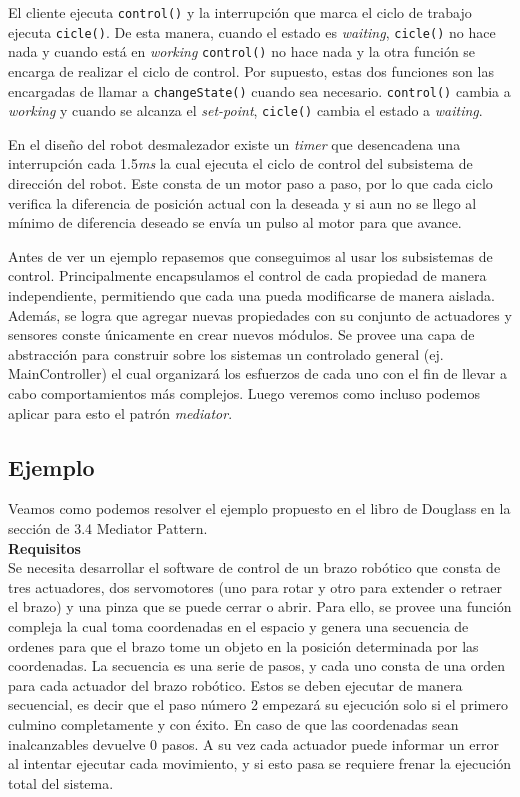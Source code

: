 El cliente ejecuta \verb|control()| y la interrupción que marca el ciclo de trabajo ejecuta \verb|cicle()|. De esta manera, cuando el estado es \textit{waiting}, \verb|cicle()| no hace nada y cuando está en \textit{working} \verb|control()| no hace nada y la otra función se encarga de realizar el ciclo de control.
Por supuesto, estas dos funciones son las encargadas de llamar a \verb|changeState()| cuando sea necesario. \verb|control()| cambia a \textit{working} y cuando se alcanza el \textit{set-point}, \verb|cicle()| cambia el estado a \textit{waiting}.

En el diseño del robot desmalezador\cite{paperPomponio} existe un \textit{timer} que desencadena una interrupción cada 1.5\textit{ms} la cual ejecuta el ciclo de control del subsistema de dirección del robot. Este consta de un motor paso a paso, por lo que cada ciclo verifica la diferencia de posición actual con la deseada y si aun no se llego al mínimo de diferencia deseado se envía un pulso al motor para que avance.

Antes de ver un ejemplo repasemos que conseguimos al usar los subsistemas de control. Principalmente encapsulamos el control de cada propiedad de manera independiente, permitiendo que cada una pueda modificarse de manera aislada. Además, se logra que agregar nuevas propiedades con su conjunto de actuadores y sensores conste únicamente en crear nuevos módulos. Se provee una capa de abstracción para construir sobre los sistemas un controlado general (ej. MainController) el cual organizará los esfuerzos de cada uno con el fin de llevar a cabo comportamientos más complejos. Luego veremos como incluso podemos aplicar para esto el patrón \textit{mediator}.

\subsection{Ejemplo}

Veamos como podemos resolver el ejemplo propuesto en el libro de Douglass\cite{douglass} en la sección de 3.4 Mediator Pattern.
\\
\noident
\textbf{Requisitos}
\\
\noident
Se necesita desarrollar el software de control de un brazo robótico que consta de tres actuadores, dos servomotores (uno para rotar y otro para extender o retraer el brazo) y una pinza que se puede cerrar o abrir. Para ello, se provee una función compleja la cual toma coordenadas en el espacio y genera una secuencia de ordenes para que el brazo tome un objeto en la posición determinada por las coordenadas. La secuencia es una serie de pasos, y cada uno consta de una orden para cada actuador del brazo robótico. Estos se deben ejecutar de manera secuencial, es decir que el paso número 2 empezará su ejecución solo si el primero culmino completamente y con éxito. En caso de que las coordenadas sean inalcanzables devuelve 0 pasos. A su vez cada actuador puede informar un error al intentar ejecutar cada movimiento, y si esto pasa se requiere frenar la ejecución total del sistema.

